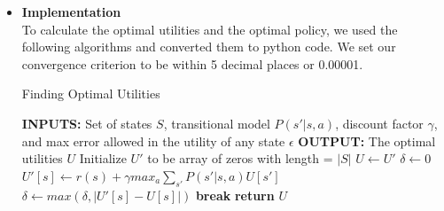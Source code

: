 \documentclass{article}
\begin{document}
\begin{itemize}
\begin{center}
            \end{center}
        \clearpage
        \item \textbf{Implementation}\\
            To calculate the optimal utilities and the optimal policy, we used the following algorithms
            and converted them to python code. We set our convergence criterion to be within
            5 decimal places or 0.00001.
            \begin{algorithm}
            \caption{Finding Optimal Utilities}
            \begin{algorithmic}
                \STATE \textbf{INPUTS:} Set of states $S$, transitional model $P(s'|s,a)$,
                    discount factor $\gamma$, and max error allowed in the utility of any state $\epsilon$
                \STATE \textbf{OUTPUT:} The optimal utilities $U$
                \STATE{}
                \STATE Initialize $U'$ to be array of zeros with length = $|S|$
                    \STATE $U \leftarrow U'$
                    \STATE $\delta \leftarrow 0$
                        \STATE $U'[s] \leftarrow r(s) + \gamma max_a\sum_{s'}P(s'|s, a)U[s']$
                        \STATE $\delta \leftarrow max(\delta, |U'[s] - U[s]|)$
                    \ENDFOR
                        \STATE \textbf{break}
                    \ENDIF
                \ENDWHILE
                \STATE \textbf{return} $U$
            \end{algorithmic}
            \end{algorithm}
            

\end{itemize}
\end{document}
